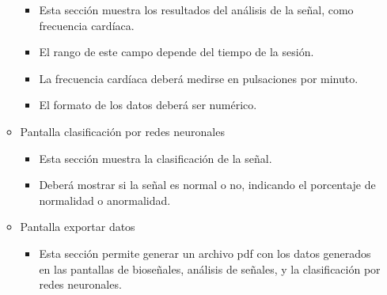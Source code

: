 \begin{itemize}
\begin{itemize}
\begin{itemize}
                        \item Esta sección muestra los resultados del análisis de la señal, como frecuencia cardíaca.
                        \item El rango de este campo depende del tiempo de la sesión.
                        \item La frecuencia cardíaca deberá medirse en pulsaciones por minuto.
                        \item El formato de los datos deberá ser numérico.
                    \end{itemize}
              \item Pantalla clasificación por redes neuronales
                    \begin{itemize}
                        \item Esta sección muestra la clasificación de la señal.
                        \item Deberá mostrar si la señal es normal o no, indicando el porcentaje de
                              normalidad o anormalidad.
                    \end{itemize}
              \item Pantalla exportar datos
                    \begin{itemize}
                        \item Esta sección permite generar un archivo pdf con los datos generados en las
                              pantallas de bioseñales, análisis de señales, y la clasificación por redes
                              neuronales.\\
                    \end{itemize}
          \end{itemize}
\end{itemize}

